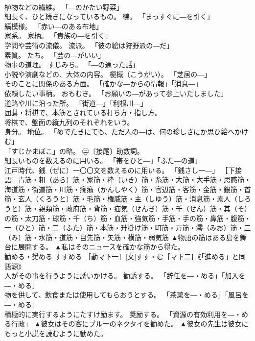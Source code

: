 \documentclass[8pt]{extreport}
\begin{document}
\begin{CJK}{UTF8}{min}
\\	植物などの繊維。 「―のかたい野菜」 
\\	細長く、ひと続きになっているもの。 線。 「まっすぐに―を引く」 
\\	縞模様。 「赤い―のある布地」 
\\	家系。 家柄。 「貴族の―を引く」 
\\	学問や芸術の流儀。 流派。 「彼の絵は狩野派の―だ」 
\\	素質。 たち。 「芸の―がいい」 
\\	物事の道理。 すじみち。 「―の通った話」 
\\	小説や演劇などの、大体の内容。 梗概（こうがい）。 「芝居の―」 
\\	そのことに関係のある方面。 「確かな―からの情報」「消息―」 
\\	依頼したい事柄。 おもむき。 「お願いの―があって参上いたしました」 
\\	道路や川に沿った所。 「街道―」「利根川―」 
\\	囲碁・将棋で、本筋とされている打ち方・指し方。 
\\	将棋で、盤面の縦九列のそれぞれをいう。 
\\	身分。 地位。 「めでたきにても、ただ人の―は、何の珍しさにか思ひ給へかけむ」 
\\	「すじかまぼこ」の略。 ㊁〔接尾〕助数詞。 
\\	細長いものを数えるのに用いる。 「帯をひと―」「ふた―の道」 
\\	江戸時代、銭（ぜに）一〇〇文を数えるのに用いる。 「銭さし一―」 ［下接語］青筋・粗（あら）筋・家筋・粋（いき）筋・糸筋・大筋・大手筋・思惑筋・海道筋・街道筋・川筋・癇癪（かんしやく）筋・官辺筋・客筋・金筋・銀筋・首筋・玄人（くろうと）筋・毛筋・権威筋・主（しゆう）筋・消息筋・素人（しろうと）筋・親類筋・政府筋・背筋・疝気（せんき）筋・千（せん）筋・其（そ）の筋・太刀筋・球筋・千（ち）筋・血筋・強気筋・手筋・手の筋・鼻筋・腹筋・一（ひと）筋・二（ふた）筋・本筋・升掛け筋・町筋・万筋・澪（みお）筋・三（み）筋・水筋・道筋・目先筋・矢筋・横筋・弱気筋	▲物語の筋はある島を舞台に展開する。 ▲私はそのニュースを確かな筋から得た。
\\	勧める・奨める	すすめる	［動マ下一］[文]すす・む［マ下二］《「進める」と同語源》 
\\	人がその事を行うように誘いかける。 勧誘する。 「辞任を―・める」「加入を―・める」 
\\	物を供して、飲食または使用してもらおうとする。 「茶菓を―・める」「風呂を―・める」 
\\	積極的に実行するようにたすけ励ます。 奨励する。 「資源の有効利用を―・める行政」	▲彼女はその客にブルーのネクタイを勧めた。 ▲彼女の先生は彼女にもっと小説を読むように勧めた。

\end{CJK}
\end{document}
